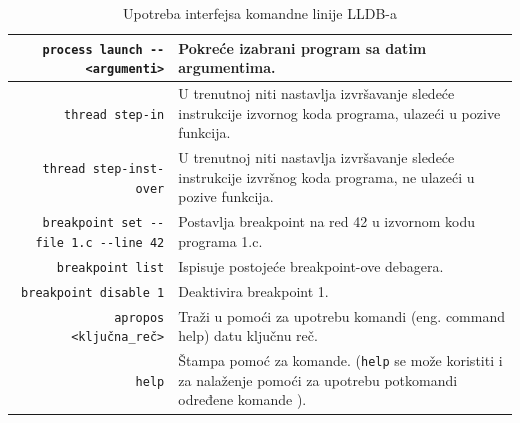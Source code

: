 \documentclass[a4paper]{article}
\begin{document}
\begin{table}[h!]
	\begin{center}
		\caption{Upotreba interfejsa komandne linije LLDB-a \cite{lldb_to_gdb_map}\cite{lldb_tutorial}}
		\small
		\begin{tabular}{|r|p{5cm}|}
			\hline
			\verb|process launch -- <argumenti>|
			& Pokreće izabrani program sa datim argumentima. \\ \hline
			\verb|thread step-in|
			& U trenutnoj niti nastavlja izvršavanje sledeće instrukcije izvornog koda programa, ulazeći u pozive funkcija.  \\ \hline
			\verb|thread step-inst-over|
			& U trenutnoj niti nastavlja izvršavanje sledeće instrukcije izvršnog koda programa, ne ulazeći u pozive funkcija. \\ \hline
			\verb|breakpoint set --file 1.c --line 42|
			& Postavlja breakpoint na red 42 u izvornom kodu programa 1.c. \\ \hline
			\verb|breakpoint list|
			& Ispisuje postojeće breakpoint-ove debagera. \\ \hline
			\verb|breakpoint disable 1|
			& Deaktivira breakpoint 1. \\ \hline
			\verb|apropos <ključna_reč>|
			& Traži u pomoći za upotrebu komandi (eng. command help) datu ključnu reč. \\ \hline
			\verb|help|
			& Štampa pomoć za komande. (\verb|help| se može koristiti i za nalaženje pomoći za upotrebu potkomandi određene komande \cite{apple_lldb_comms}). \\ \hline
		\end{tabular}
		\label{tab:tabela3}
	\end{center}
\end{table}

\end{document}
